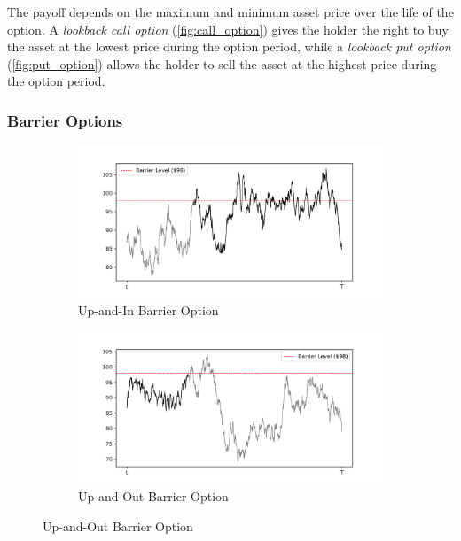 \documentclass[a4paper]{report}
\begin{document}
\noindent The payoff depends on the maximum and minimum asset price over the life of the option. A \textit{lookback call option} (\autoref{fig:call_option}) gives the holder the right to buy the asset at the lowest price during the option period, while a \textit{lookback put option} (\autoref{fig:put_option}) allows the holder to sell the asset at the highest price during the option period.

\subsubsection{Barrier Options}\label{barrier}
\begin{figure}[H]
    \begin{subfigure}{.5\linewidth}
      \includegraphics[width=\linewidth]{images/up_in_option.png}
      \caption{Up-and-In Barrier Option}
      \label{fig:up_in_option}
    \end{subfigure}\hfill
    \begin{subfigure}{.5\linewidth}
      \includegraphics[width=\linewidth]{images/up_out_option.png}
      \caption{Up-and-Out Barrier Option}
      \label{fig:up_out_option}
    \end{subfigure}
    

\end{figure}
\end{document}
